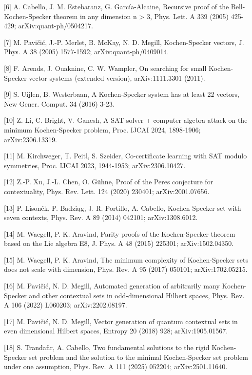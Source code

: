 \documentclass[11pt,a4paper]{article}
\begin{document}
{[}6{]} A. Cabello, J. M. Estebaranz, G. García-Alcaine, Recursive proof of the Bell-Kochen-Specker theorem in any dimension n \textgreater{} 3, Phys. Lett. A 339 (2005) 425-429; arXiv:quant-ph/0504217.

{[}7{]} M. Pavičić, J.-P. Merlet, B. McKay, N. D. Megill, Kochen-Specker vectors, J. Phys. A 38 (2005) 1577-1592; arXiv:quant-ph/0409014.

{[}8{]} F. Arends, J. Ouaknine, C. W. Wampler, On searching for small Kochen-Specker vector systems (extended version), arXiv:1111.3301 (2011).

{[}9{]} S. Uijlen, B. Westerbaan, A Kochen-Specker system has at least 22 vectors, New Gener. Comput. 34 (2016) 3-23.

{[}10{]} Z. Li, C. Bright, V. Ganesh, A SAT solver + computer algebra attack on the minimum Kochen-Specker problem, Proc. IJCAI 2024, 1898-1906; arXiv:2306.13319.

{[}11{]} M. Kirchweger, T. Peitl, S. Szeider, Co-certificate learning with SAT modulo symmetries, Proc. IJCAI 2023, 1944-1953; arXiv:2306.10427.

{[}12{]} Z.-P. Xu, J.-L. Chen, O. Gühne, Proof of the Peres conjecture for contextuality, Phys. Rev. Lett. 124 (2020) 230401; arXiv:2001.07656.

{[}13{]} P. Lisoněk, P. Badziąg, J. R. Portillo, A. Cabello, Kochen-Specker set with seven contexts, Phys. Rev. A 89 (2014) 042101; arXiv:1308.6012.

{[}14{]} M. Waegell, P. K. Aravind, Parity proofs of the Kochen-Specker theorem based on the Lie algebra E8, J. Phys. A 48 (2015) 225301; arXiv:1502.04350.

{[}15{]} M. Waegell, P. K. Aravind, The minimum complexity of Kochen-Specker sets does not scale with dimension, Phys. Rev. A 95 (2017) 050101; arXiv:1702.05215.

{[}16{]} M. Pavičić, N. D. Megill, Automated generation of arbitrarily many Kochen-Specker and other contextual sets in odd-dimensional Hilbert spaces, Phys. Rev. A 106 (2022) L060203; arXiv:2202.08197.

{[}17{]} M. Pavičić, N. D. Megill, Vector generation of quantum contextual sets in even dimensional Hilbert spaces, Entropy 20 (2018) 928; arXiv:1905.01567.

{[}18{]} S. Trandafir, A. Cabello, Two fundamental solutions to the rigid Kochen-Specker set problem and the solution to the minimal Kochen-Specker set problem under one assumption, Phys. Rev. A 111 (2025) 052204; arXiv:2501.11640.
\end{document}
